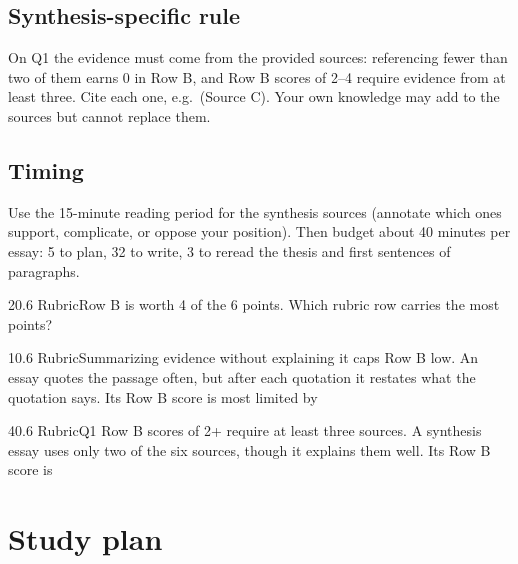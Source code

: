\documentclass[11pt]{article}
\begin{document}
\subsection{Synthesis-specific rule}
On Q1 the evidence must come from the provided sources: referencing fewer than two of them earns 0 in Row B, and Row B scores of 2--4 require evidence from at least three. Cite each one, e.g.\ (Source C). Your own knowledge may add to the sources but cannot replace them.

\subsection{Timing}
Use the 15-minute reading period for the synthesis sources (annotate which ones support, complicate, or oppose your position). Then budget about 40 minutes per essay: 5 to plan, 32 to write, 3 to reread the thesis and first sentences of paragraphs.

\begin{q}{2}{0.6 Rubric}{Row B is worth 4 of the 6 points.}
Which rubric row carries the most points?
\end{q}

\begin{q}{1}{0.6 Rubric}{Summarizing evidence without explaining it caps Row B low.}
An essay quotes the passage often, but after each quotation it restates what the quotation says. Its Row B score is most limited by
\end{q}

\begin{q}{4}{0.6 Rubric}{Q1 Row B scores of 2+ require at least three sources.}
A synthesis essay uses only two of the six sources, though it explains them well. Its Row B score is
\end{q}

\section{Study plan}
\end{document}
